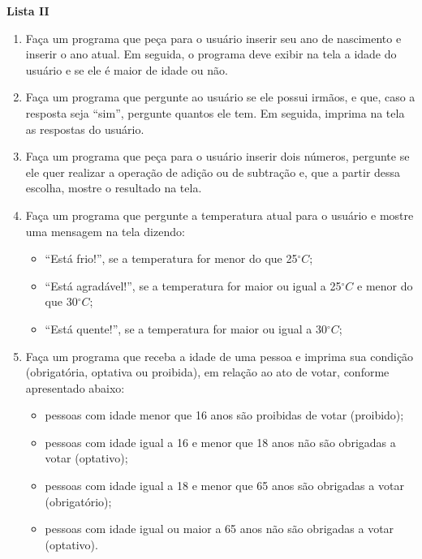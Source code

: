 \documentclass[12pt,a4paper]{article}
\begin{document}
\begin{center}
  \textbf{Lista II}
\end{center}

\begin{enumerate}
  \item Faça um programa que peça para o usuário inserir seu ano de nascimento e inserir o ano atual.
  Em seguida, o programa deve exibir na tela a idade do usuário e se ele é maior de idade ou não.

  \item Faça um programa que pergunte ao usuário se ele possui irmãos, e que, caso a resposta seja ``sim'',
  pergunte quantos ele tem. Em seguida, imprima na tela as respostas do usuário.
  
  \item Faça um programa que peça para o usuário inserir dois números, pergunte se ele quer realizar
  a operação de adição ou de subtração e, que a partir dessa escolha, mostre o resultado na tela.
  
  \item Faça um programa que pergunte a temperatura atual para o usuário e mostre uma mensagem na tela dizendo:
    \begin{itemize}
      \item ``Está frio!'', se a temperatura for menor do que 25$^\circ C$;
      \item ``Está agradável!'', se a temperatura for maior ou igual a 25$^\circ C$ e menor do que 30$^\circ C$;
      \item ``Está quente!'', se a temperatura for maior ou igual a 30$^\circ C$;
    \end{itemize}

  \item Faça um programa que receba a idade de uma pessoa e imprima sua condição (obrigatória, optativa ou proibida), 
  em relação ao ato de votar, conforme apresentado abaixo:
    \begin{itemize}
      \item pessoas com idade menor que 16 anos são proibidas de votar (proibido);
      \item pessoas com idade igual a 16 e menor que 18 anos não são obrigadas a votar (optativo);
      \item pessoas com idade igual a 18 e menor que 65 anos são obrigadas a votar (obrigatório);
      \item pessoas com idade igual ou maior a 65 anos não são obrigadas a votar (optativo).
    \end{itemize}    

\end{enumerate}
\end{document}
